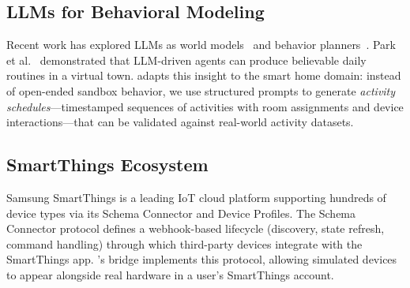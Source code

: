 \subsection{LLMs for Behavioral Modeling}

Recent work has explored LLMs as world models~\cite{llm-world-model} and behavior
planners~\cite{llm-planner}.  Park et al.~\cite{generative-agents} demonstrated
that LLM-driven agents can produce believable daily routines in a
virtual town.  \sys{} adapts this insight to the smart home domain:
instead of open-ended sandbox behavior, we use structured prompts to
generate \emph{activity schedules}---timestamped sequences of
activities with room assignments and device interactions---that can be
validated against real-world activity datasets.

\subsection{SmartThings Ecosystem}

Samsung SmartThings is a leading IoT cloud platform supporting
hundreds of device types via its Schema Connector and Device
Profiles.  The Schema Connector protocol defines a webhook-based
lifecycle (discovery, state refresh, command handling) through which
third-party devices integrate with the SmartThings app.  \sys{}'s
bridge implements this protocol, allowing simulated devices to appear
alongside real hardware in a user's SmartThings account.
